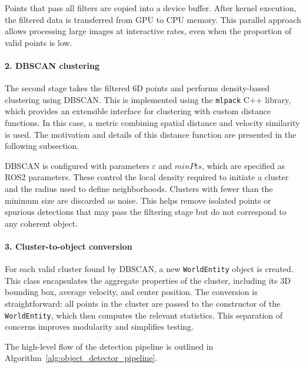 Points that pass all filters are copied into a device buffer. After kernel execution,
the filtered data is transferred from GPU to CPU memory. This parallel approach allows
processing large images at interactive rates, even when the proportion of valid points
is low.

\paragraph{2. DBSCAN clustering}

The second stage takes the filtered 6D points and performs density-based clustering
using \gls{DBSCAN}. This is implemented using the \texttt{mlpack} C++ library, which provides
an extensible interface for clustering with custom distance functions. In this case,
a metric combining spatial distance and velocity similarity is used. The motivation
and details of this distance function are presented in the following subsection.

\gls{DBSCAN} is configured with parameters $\varepsilon$ and $minPts$, which are specified
as ROS2 parameters. These control the local density required to initiate a cluster and
the radius used to define neighborhoods. Clusters with fewer than the minimum size are
discarded as noise. This helps remove isolated points or spurious detections that may
pass the filtering stage but do not correspond to any coherent object. \paragraph{3. Cluster-to-object conversion}

For each valid cluster found by \gls{DBSCAN}, a new \texttt{WorldEntity} object is created.
This class encapsulates the aggregate properties of the cluster, including its 3D
bounding box, average velocity, and center position. The conversion is straightforward:
all points in the cluster are passed to the constructor of the \texttt{WorldEntity},
which then computes the relevant statistics. This separation of concerns improves
modularity and simplifies testing.

The high-level flow of the detection pipeline is outlined in
Algorithm~\ref{alg:object_detector_pipeline}.

